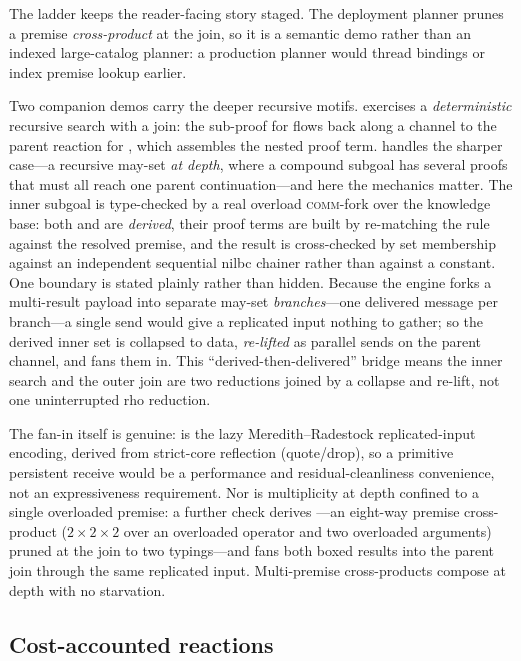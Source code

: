 The ladder keeps the reader-facing story staged.  The deployment planner prunes a
premise \emph{cross-product} at the join, so it is a semantic demo rather than an
indexed large-catalog planner: a production planner would thread bindings or index
premise lookup earlier.

Two companion demos carry the deeper recursive motifs.
 exercises a \emph{deterministic} recursive
search with a join: the sub-proof for  flows back along a channel to
the parent reaction for , which assembles the nested proof term.
 handles the sharper case---a recursive
may-set \emph{at depth}, where a compound subgoal has several proofs that must all
reach one parent continuation---and here the mechanics matter.  The inner subgoal
 is type-checked by a real overload \textsc{comm}-fork over the
knowledge base: both  and  are
\emph{derived}, their proof terms are built by re-matching the rule against the
resolved premise, and the result is cross-checked by set membership against an
independent sequential nilbc chainer rather than against a constant.  One boundary
is stated plainly rather than hidden.  Because the engine forks a multi-result
payload into separate may-set \emph{branches}---one delivered message per branch---a
single send would give a replicated input nothing to gather; so the derived inner
set is collapsed to data, \emph{re-lifted} as parallel sends on the parent channel,
and  fans them in.  This ``derived-then-delivered'' bridge
means the inner search and the outer join are two reductions joined by a collapse
and re-lift, not one uninterrupted rho reduction.

The fan-in itself is genuine:  is the lazy
Meredith--Radestock replicated-input encoding, derived from strict-core reflection
(quote/drop), so a primitive persistent receive would be a performance and
residual-cleanliness convenience, not an expressiveness requirement.  Nor is
multiplicity at depth confined to a single overloaded premise: a further check
derives ---an eight-way premise cross-product
($2\times2\times2$ over an overloaded operator and two overloaded arguments) pruned
at the join to two typings---and fans both boxed results into the parent join
through the same replicated input.  Multi-premise cross-products compose at depth
with no starvation.

\subsection{Cost-accounted reactions}
\label{sec:rho-cost}

